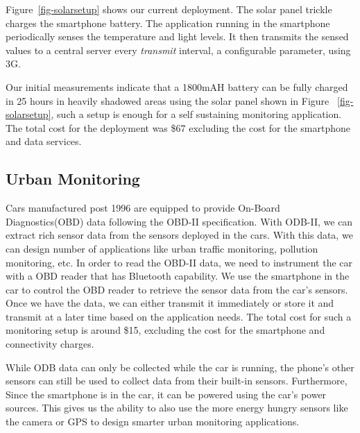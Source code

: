 Figure~\ref{fig-solarsetup} shows our current deployment. The solar panel trickle
charges the smartphone battery. The application running in the smartphone
periodically senses the temperature and light levels. It then transmits the
sensed values to a central server every \textit{transmit} interval, a
configurable parameter, using 3G. 

Our initial measurements indicate that a 1800mAH battery can be fully charged
in 25
hours in heavily shadowed areas using the solar panel shown in Figure
~\ref{fig-solarsetup}, such a setup is
enough for a self sustaining monitoring application. The total cost for the
deployment was \$67 excluding the cost for the smartphone and data services.

\subsection{Urban Monitoring}
Cars manufactured post 1996 are equipped to provide On-Board Diagnostics(OBD)
data following the OBD-II specification. With ODB-II, we can extract rich
sensor data from the sensors deployed in the cars. With this data, we can design number of
applications like urban traffic monitoring, pollution monitoring, etc. In order to 
read the OBD-II data, we need to instrument the car with a OBD reader that has Bluetooth 
capability. We use the smartphone in the car to control
the OBD reader to retrieve the sensor data from the car's sensors. Once we have
the data, we can either transmit it immediately or store it and transmit at a
later time based on the application needs. The total cost for such a monitoring setup
is around \$15, excluding the cost for the smartphone and connectivity charges.

While ODB data can only be collected while the car is running, the phone's other
sensors can still be used to collect data from their built-in sensors.  Furthermore,
Since the smartphone is in the car, it can be powered using the car's power
sources. This gives us the ability to also use the more energy hungry sensors
like the camera or GPS to design smarter urban monitoring applications. 

